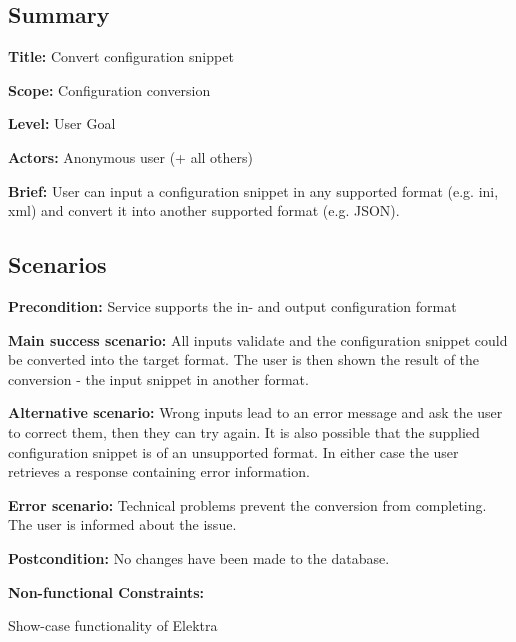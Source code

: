 \subsection*{Summary}


\begin{DoxyItemize}
\item {\bfseries Title\+:} Convert configuration snippet
\item {\bfseries Scope\+:} Configuration conversion
\item {\bfseries Level\+:} User Goal
\item {\bfseries Actors\+:} Anonymous user (+ all others)
\item {\bfseries Brief\+:} User can input a configuration snippet in any supported format (e.\+g. ini, xml) and convert it into another supported format (e.\+g. J\+S\+ON).
\end{DoxyItemize}

\subsection*{Scenarios}


\begin{DoxyItemize}
\item {\bfseries Precondition\+:} Service supports the in-\/ and output configuration format
\item {\bfseries Main success scenario\+:} All inputs validate and the configuration snippet could be converted into the target format. The user is then shown the result of the conversion -\/ the input snippet in another format.
\item {\bfseries Alternative scenario\+:} Wrong inputs lead to an error message and ask the user to correct them, then they can try again. It is also possible that the supplied configuration snippet is of an unsupported format. In either case the user retrieves a response containing error information.
\item {\bfseries Error scenario\+:} Technical problems prevent the conversion from completing. The user is informed about the issue.
\item {\bfseries Postcondition\+:} No changes have been made to the database.
\item {\bfseries Non-\/functional Constraints\+:}
\begin{DoxyItemize}
\item Show-\/case functionality of Elektra 
\end{DoxyItemize}
\end{DoxyItemize}